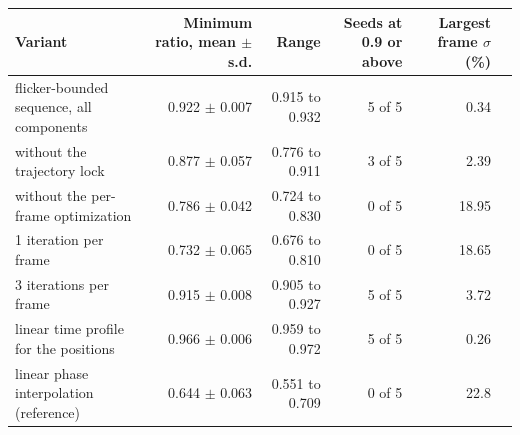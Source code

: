 \begin{tabular}{@{}l r r r r r@{}}
\toprule
Variant & Minimum ratio, mean $\pm$ s.d. & Range & Seeds at 0.9 or above & Largest frame $\sigma$ (\%) \\
\midrule
flicker-bounded sequence, all components & 0.922 $\pm$ 0.007 & 0.915 to 0.932 & 5 of 5 & 0.34 \\
without the trajectory lock & 0.877 $\pm$ 0.057 & 0.776 to 0.911 & 3 of 5 & 2.39 \\
without the per-frame optimization & 0.786 $\pm$ 0.042 & 0.724 to 0.830 & 0 of 5 & 18.95 \\
1 iteration per frame & 0.732 $\pm$ 0.065 & 0.676 to 0.810 & 0 of 5 & 18.65 \\
3 iterations per frame & 0.915 $\pm$ 0.008 & 0.905 to 0.927 & 5 of 5 & 3.72 \\
linear time profile for the positions & 0.966 $\pm$ 0.006 & 0.959 to 0.972 & 5 of 5 & 0.26 \\
linear phase interpolation (reference) & 0.644 $\pm$ 0.063 & 0.551 to 0.709 & 0 of 5 & 22.8 \\
\bottomrule
\end{tabular}
